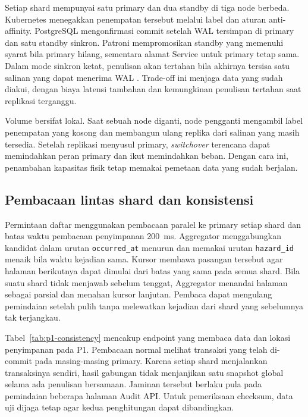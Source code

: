 Setiap shard mempunyai satu primary dan dua standby di tiga node berbeda. Kubernetes menegakkan penempatan tersebut melalui label dan aturan anti-affinity. PostgreSQL mengonfirmasi commit setelah WAL tersimpan di primary dan satu standby sinkron. Patroni mempromosikan standby yang memenuhi syarat bila primary hilang, sementara alamat Service untuk primary tetap sama. Dalam mode sinkron ketat, penulisan akan tertahan bila akhirnya tersisa satu salinan yang dapat menerima WAL \cite{patroni,postgres}. Trade-off ini menjaga data yang sudah diakui, dengan biaya latensi tambahan dan kemungkinan penulisan tertahan saat replikasi terganggu.

Volume bersifat lokal. Saat sebuah node diganti, node pengganti mengambil label penempatan yang kosong dan membangun ulang replika dari salinan yang masih tersedia. Setelah replikasi menyusul primary, \emph{switchover} terencana dapat memindahkan peran primary dan ikut memindahkan beban. Dengan cara ini, penambahan kapasitas fisik tetap memakai pemetaan data yang sudah berjalan.

\subsection{Pembacaan lintas shard dan konsistensi}

Permintaan daftar menggunakan pembacaan paralel ke primary setiap shard dan batas waktu pembacaan penyimpanan 200~ms. Aggregator menggabungkan kandidat dalam urutan \texttt{occurred\_at} menurun dan memakai urutan \texttt{hazard\_id} menaik bila waktu kejadian sama. Kursor membawa pasangan tersebut agar halaman berikutnya dapat dimulai dari batas yang sama pada semua shard. Bila suatu shard tidak menjawab sebelum tenggat, Aggregator menandai halaman sebagai parsial dan menahan kursor lanjutan. Pembaca dapat mengulang pemindaian setelah pulih tanpa melewatkan kejadian dari shard yang sebelumnya tak terjangkau.

Tabel~\ref{tab:p1-consistency} mencakup endpoint yang membaca data dan lokasi penyimpanan pada P1. Pembacaan normal melihat transaksi yang telah di-commit pada masing-masing primary. Karena setiap shard menjalankan transaksinya sendiri, hasil gabungan tidak menjanjikan satu snapshot global selama ada penulisan bersamaan. Jaminan tersebut berlaku pula pada pemindaian beberapa halaman Audit API. Untuk pemeriksaan checksum, data uji dijaga tetap agar kedua penghitungan dapat dibandingkan.

